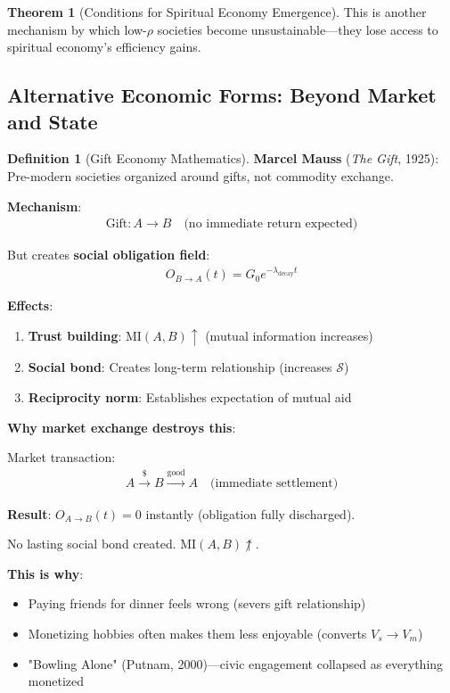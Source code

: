 \documentclass[11pt,a4paper]{article}
\theoremstyle{definition}
\newtheorem{definition}{Definition}[section]
\newtheorem{theorem}{Theorem}[section]
\theoremstyle{remark}
\begin{document}
\begin{small}
\begin{enumerate}
\begin{theorem}[Conditions for Spiritual Economy Emergence]
This is another mechanism by which low-\(\rho\) societies become unsustainable—they lose access to spiritual economy's efficiency gains.
\end{theorem}

\subsection{Alternative Economic Forms: Beyond Market and State}

\begin{definition}[Gift Economy Mathematics]
\textbf{Marcel Mauss} (\textit{The Gift}, 1925): Pre-modern societies organized around gifts, not commodity exchange.

\textbf{Mechanism}:
\begin{align}
\text{Gift}: A \to B \quad \text{(no immediate return expected)}
\end{align}

But creates \textbf{social obligation field}:
\begin{align}
O_{B \to A}(t) = G_0 e^{-\lambda_{\text{decay}} t}
\end{align}

\textbf{Effects}:
\begin{enumerate}
    \item \textbf{Trust building}: \(\text{MI}(A, B) \uparrow\) (mutual information increases)
    \item \textbf{Social bond}: Creates long-term relationship (increases \(\mathcal{S}\))
    \item \textbf{Reciprocity norm}: Establishes expectation of mutual aid
\end{enumerate}

\textbf{Why market exchange destroys this}:

Market transaction:
\begin{align}
A \xrightarrow{\text{\$}} B \xrightarrow{\text{good}} A \quad \text{(immediate settlement)}
\end{align}

\textbf{Result}: \(O_{A \to B}(t) = 0\) instantly (obligation fully discharged).

No lasting social bond created. \(\text{MI}(A, B) \not\uparrow\).

\textbf{This is why}:
\begin{itemize}
    \item Paying friends for dinner feels wrong (severs gift relationship)
    \item Monetizing hobbies often makes them less enjoyable (converts \(V_s \to V_m\))
    \item "Bowling Alone" (Putnam, 2000)—civic engagement collapsed as everything monetized
\end{itemize}


\end{definition}
\end{enumerate}
\end{small}
\end{document}
